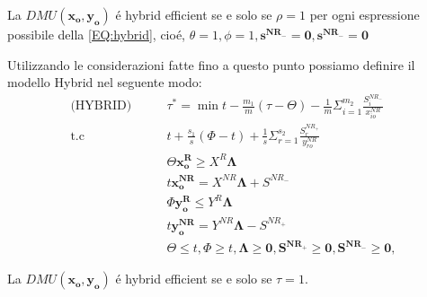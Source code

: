 \begin{definiz}
La $DMU(\boldsymbol{x_{o},y_{o}})$ \'e hybrid efficient se e solo se $\rho = 1$ per ogni espressione possibile della \ref{EQ:hybrid}, cio\'e, $ \theta = 1, \phi = 1, \boldsymbol{s^{NR_{-}} = 0} , \boldsymbol{s^{NR_{-}} = 0}$  
\end{definiz}
\begin{definiz} Utilizzando le considerazioni fatte fino a questo punto possiamo definire il modello Hybrid nel seguente modo:
\begin{equation}
\begin{split}
\text{(HYBRID)} \qquad & \tau^* = \min t - \frac{m_1}{m}(\tau - \Theta) - \frac{1}{m} \Sigma^{m_2}_{i = 1} \frac{S^{NR_{-}}_{i}}{x^{NR}_{io}} \\
\text{t.c} \qquad & t + \frac{s_1}{s}(\Phi - t) + \frac{1}{s} \Sigma^{s_2}_{r = 1} \frac{S^{NR_{+}}_{r}}{y^{NR}_{ro}} \\
& \Theta\boldsymbol{x^{R}_o} \geq X^R \boldsymbol{\Lambda} \\
& t\boldsymbol{x^{NR}_o} = X^{NR}\boldsymbol{\Lambda} + S^{NR_{-}}\\
& \Phi\boldsymbol{y^{R}_o} \leq Y^R \boldsymbol{\Lambda} \\
& t\boldsymbol{y^{NR}_o} = Y^{NR}\boldsymbol{\Lambda} - S^{NR_{+}}\\
& \Theta \leq t, \Phi \geq t, \boldsymbol{\Lambda \geq 0}, \boldsymbol{S^{NR_{+}} \geq 0}, \boldsymbol{S^{NR_{-}} \geq 0}, 
\end{split}
\end{equation}
\end{definiz}
\begin{teor} La $DMU(\boldsymbol{x_o, y_o})$ \'e hybrid efficient se e solo se $\tau = 1$. 
\end{teor}
